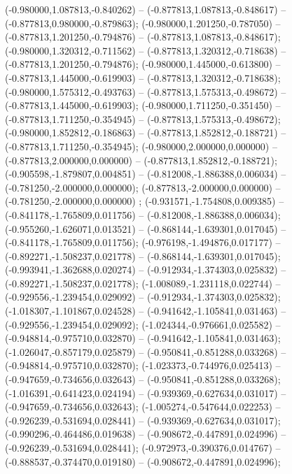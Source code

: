  (-0.980000,1.087813,-0.840262) -- (-0.877813,1.087813,-0.848617) -- (-0.877813,0.980000,-0.879863);
 (-0.980000,1.201250,-0.787050) -- (-0.877813,1.201250,-0.794876) -- (-0.877813,1.087813,-0.848617);
 (-0.980000,1.320312,-0.711562) -- (-0.877813,1.320312,-0.718638) -- (-0.877813,1.201250,-0.794876);
 (-0.980000,1.445000,-0.613800) -- (-0.877813,1.445000,-0.619903) -- (-0.877813,1.320312,-0.718638);
 (-0.980000,1.575312,-0.493763) -- (-0.877813,1.575313,-0.498672) -- (-0.877813,1.445000,-0.619903);
 (-0.980000,1.711250,-0.351450) -- (-0.877813,1.711250,-0.354945) -- (-0.877813,1.575313,-0.498672);
 (-0.980000,1.852812,-0.186863) -- (-0.877813,1.852812,-0.188721) -- (-0.877813,1.711250,-0.354945);
 (-0.980000,2.000000,0.000000) -- (-0.877813,2.000000,0.000000) -- (-0.877813,1.852812,-0.188721);
 (-0.905598,-1.879807,0.004851) -- (-0.812008,-1.886388,0.006034) -- (-0.781250,-2.000000,0.000000);
 (-0.877813,-2.000000,0.000000) -- (-0.781250,-2.000000,0.000000) ;
 (-0.931571,-1.754808,0.009385) -- (-0.841178,-1.765809,0.011756) -- (-0.812008,-1.886388,0.006034);
 (-0.955260,-1.626071,0.013521) -- (-0.868144,-1.639301,0.017045) -- (-0.841178,-1.765809,0.011756);
 (-0.976198,-1.494876,0.017177) -- (-0.892271,-1.508237,0.021778) -- (-0.868144,-1.639301,0.017045);
 (-0.993941,-1.362688,0.020274) -- (-0.912934,-1.374303,0.025832) -- (-0.892271,-1.508237,0.021778);
 (-1.008089,-1.231118,0.022744) -- (-0.929556,-1.239454,0.029092) -- (-0.912934,-1.374303,0.025832);
 (-1.018307,-1.101867,0.024528) -- (-0.941642,-1.105841,0.031463) -- (-0.929556,-1.239454,0.029092);
 (-1.024344,-0.976661,0.025582) -- (-0.948814,-0.975710,0.032870) -- (-0.941642,-1.105841,0.031463);
 (-1.026047,-0.857179,0.025879) -- (-0.950841,-0.851288,0.033268) -- (-0.948814,-0.975710,0.032870);
 (-1.023373,-0.744976,0.025413) -- (-0.947659,-0.734656,0.032643) -- (-0.950841,-0.851288,0.033268);
 (-1.016391,-0.641423,0.024194) -- (-0.939369,-0.627634,0.031017) -- (-0.947659,-0.734656,0.032643);
 (-1.005274,-0.547644,0.022253) -- (-0.926239,-0.531694,0.028441) -- (-0.939369,-0.627634,0.031017);
 (-0.990296,-0.464486,0.019638) -- (-0.908672,-0.447891,0.024996) -- (-0.926239,-0.531694,0.028441);
 (-0.972973,-0.390376,0.014767) -- (-0.888537,-0.374470,0.019180) -- (-0.908672,-0.447891,0.024996);
